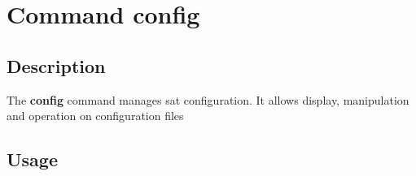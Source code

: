 \documentclass[a4paper,10pt,english]{sphinxmanual}
\begin{document}
\section{Command config}
\label{commands/config:svn}\label{commands/config:command-config}\label{commands/config::doc}

\subsection{Description}
\label{commands/config:description}
The \textbf{config} command manages sat configuration.
It allows display, manipulation and operation on configuration files


\subsection{Usage}
\end{document}
